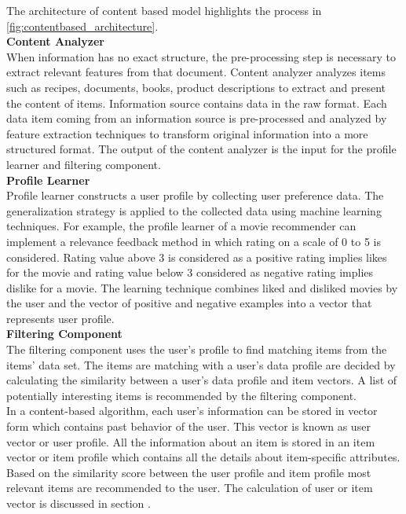 \noindent 
The architecture of content based model highlights the process in \autoref{fig:contentbased_architecture}. 
\\
\noindent \textbf{Content Analyzer}
\\
When information has no exact structure, the pre-processing step is necessary to extract relevant features from that document. Content analyzer analyzes items such as recipes, documents, books, product descriptions to extract and present the content of items. Information source contains data in the raw format. Each data item coming from an information source is pre-processed and analyzed by feature extraction techniques to transform original information into a more structured format. The output of the content analyzer is the input for the profile learner and filtering component.
\\
\noindent \textbf{Profile Learner}
\\
Profile learner constructs a user profile by collecting user preference data. The generalization strategy is applied to the collected data using machine learning techniques. For example, the profile learner of a movie recommender can implement a relevance feedback method in which rating on a scale of 0 to 5 is considered. Rating value above 3 is considered as a positive rating implies likes for the movie and rating value below 3 considered as negative rating implies dislike for a movie. The learning technique combines liked and disliked movies by the user and the vector of positive and negative examples into a vector that represents user profile. 
\\
\noindent \textbf{Filtering Component}
\\
The filtering component uses the user's profile to find matching items from the items' data set. The items are matching with a user's data profile are decided by calculating the similarity between a user's data profile and item vectors. A list of potentially interesting items is recommended by the filtering component. 
\\
\noindent
In a content-based algorithm, each user's information can be stored in vector form which contains past behavior of the user. This vector is known as user vector or user profile. All the information about an item is stored in an item vector or item profile which contains all the details about item-specific attributes. Based on the similarity score between the user profile and item profile most relevant items are recommended to the user. The calculation of user or item vector is discussed in section .

